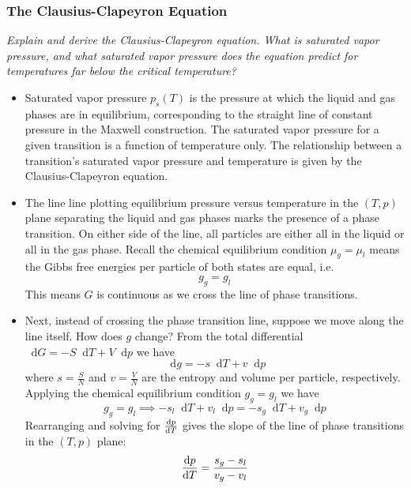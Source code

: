 \documentclass[11pt, a4paper]{article}
\newcommand{\diff}{\mathop{}\!\mathrm{d}} %
\begin{document}
\subsubsection{The Clausius-Clapeyron Equation}
\textit{Explain and derive the Clausius-Clapeyron equation. What is saturated vapor pressure, and what saturated vapor pressure does the equation predict for temperatures far below the critical temperature? }

\begin{itemize}

	\item Saturated vapor pressure $ p_{s}(T) $ is the pressure at which the liquid and gas phases are in equilibrium, corresponding to the straight line of constant pressure in the Maxwell construction. The saturated vapor pressure for a given transition is a function of temperature only. The relationship between a transition's saturated vapor pressure and temperature is given by the Clausius-Clapeyron equation.
	
	\item The line line plotting equilibrium pressure versus temperature in the $ (T, p) $ plane separating the liquid and gas phases marks the presence of a phase transition. On either side of the line, all particles are either all in the liquid or all in the gas phase. Recall the chemical equilibrium condition $ \mu_{g} = \mu_{l} $ means the Gibbs free energies per particle of both states are equal, i.e.
	\begin{equation*}
		 g_{g} = g_{l} 
	\end{equation*}
	This means $ G $ is continuous as we cross the line of phase transitions. 
	
	\item Next, instead of crossing the phase transition line, suppose we move along the line itself. How does $ g $ change? From the total differential $ \diff G = -S \diff T + V\diff p  $ we have
	\begin{equation*}
		\diff g = - s \diff T + v \diff p
	\end{equation*}
	where $ s = \frac{S}{N}$ and $ v = \frac{V}{N} $ are the entropy and volume per particle, respectively. Applying the chemical equilibrium condition $ g_{g} = g_{l}  $ we have
	\begin{equation*}
		g_{g} = g_{l} \implies - s_{l} \diff T + v_{l} \diff p = - s_{g} \diff T + v_{g} \diff p
	\end{equation*}
	Rearranging and solving for $ \dv{p}{T} $ gives the slope of the line of phase transitions in the $ (T, p) $ plane:
	\begin{equation*}
		\dv{p}{T} = \frac{s_{g} - s_{l}}{v_{g} - v_{l}}
	\end{equation*}
	

\end{itemize}
\end{document}
